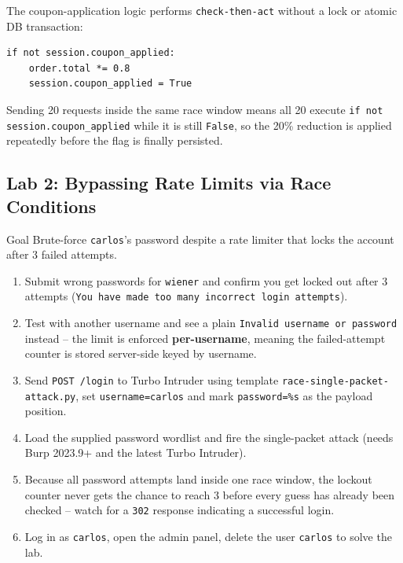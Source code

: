 \documentclass[11pt]{article}
\begin{document}
\begin{causebox}
The coupon-application logic performs \texttt{check-then-act} without a lock or atomic DB transaction:
\begin{lstlisting}[style=code]
if not session.coupon_applied:
    order.total *= 0.8
    session.coupon_applied = True
\end{lstlisting}
Sending 20 requests inside the same race window means all 20 execute \texttt{if not session.coupon\_applied} while it is still \texttt{False}, so the 20\% reduction is applied repeatedly before the flag is finally persisted.
\end{causebox}

\subsection{Lab 2: Bypassing Rate Limits via Race Conditions}
\begin{labbox}{Goal}
Brute-force \texttt{carlos}'s password despite a rate limiter that locks the account after 3 failed attempts.
\end{labbox}
\begin{enumerate}[leftmargin=1.2em]
  \item Submit wrong passwords for \texttt{wiener} and confirm you get locked out after 3 attempts (\texttt{You have made too many incorrect login attempts}).
  \item Test with another username and see a plain \texttt{Invalid username or password} instead -- the limit is enforced \textbf{per-username}, meaning the failed-attempt counter is stored server-side keyed by username.
  \item Send \texttt{POST /login} to Turbo Intruder using template \texttt{race-single-packet-attack.py}, set \texttt{username=carlos} and mark \texttt{password=\%s} as the payload position.
  \item Load the supplied password wordlist and fire the single-packet attack (needs Burp 2023.9+ and the latest Turbo Intruder).
  \item Because all password attempts land inside one race window, the lockout counter never gets the chance to reach 3 before every guess has already been checked -- watch for a \texttt{302} response indicating a successful login.
  \item Log in as \texttt{carlos}, open the admin panel, delete the user \texttt{carlos} to solve the lab.
\end{enumerate}
\end{document}
